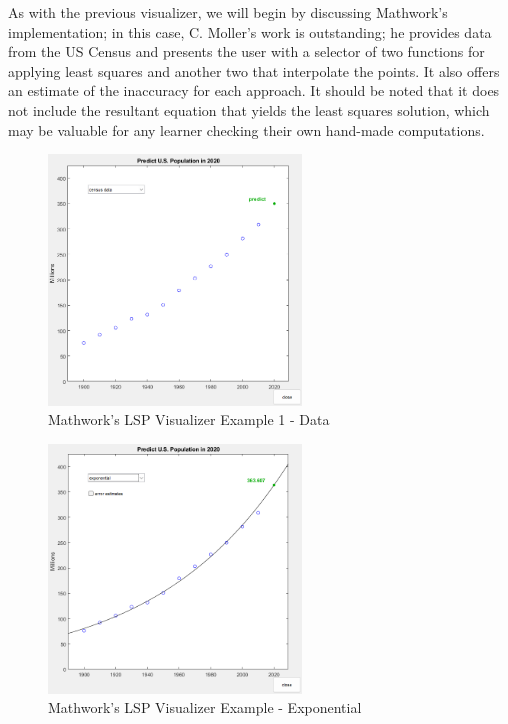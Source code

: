As with the previous visualizer, we will begin by discussing Mathwork's implementation; in this case, C. Moller's work is outstanding; he provides data from the US Census and presents the user with a selector of two functions for applying least squares and another two that interpolate the points. It also offers an estimate of the inaccuracy for each approach. It should be noted that it does not include the resultant equation that yields the least squares solution, which may be valuable for any learner checking their own hand-made computations.

\begin{figure}[H]
    \centering
    \includegraphics[width=0.6\textwidth]{Include/Images/Thesis/Development/Visualizers/LSP/Mathworks.LSP.Ex1.png}
    \caption{Mathwork's \cite{doi:10.1137/1.9780898717952} LSP Visualizer Example 1 - Data}
    \label{fig:Mathwork's NonLinear Visualizer Example - Data}
\end{figure}
\begin{figure}[H]
    \centering
    \includegraphics[width=0.6\textwidth]{Include/Images/Thesis/Development/Visualizers/LSP/Mathworks.LSP.Ex1.2.png}
    \caption{Mathwork's \cite{doi:10.1137/1.9780898717952} LSP Visualizer Example - Exponential}
    \label{fig:Mathwork's Least Squares Visualizer Example - Exponential}
\end{figure}
